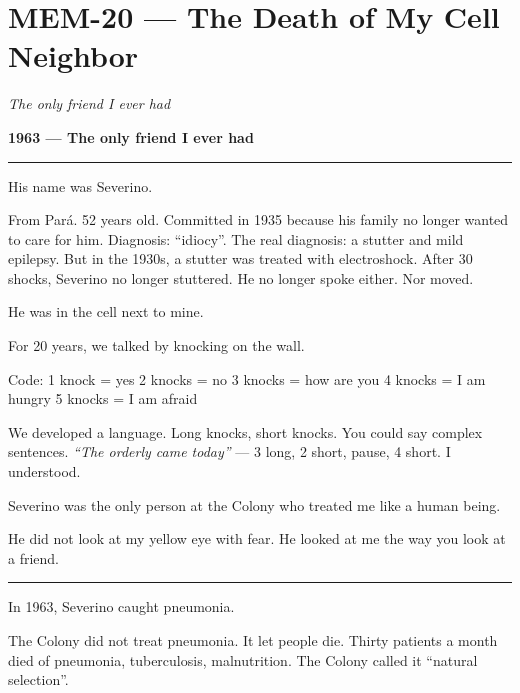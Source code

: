 \section*{\textbf{MEM-20} --- The Death of My Cell Neighbor}

\noindent \textit{The only friend I ever had}

\noindent \textbf{1963 --- The only friend I ever had}

\vspace{0.5em}\noindent\rule{\textwidth}{0.5pt}\vspace{0.5em}

\noindent His name was Severino.

\noindent From Pará. 52 years old. Committed in 1935 because his family no longer wanted to care for him. Diagnosis: \textquotedblleft{}idiocy\textquotedblright{}. The real diagnosis: a stutter and mild epilepsy. But in the 1930s, a stutter was treated with electroshock. After 30 shocks, Severino no longer stuttered. He no longer spoke either. Nor moved.

\noindent He was in the cell next to mine.

\noindent For 20 years, we talked by knocking on the wall.

\noindent Code:
1 knock = yes
2 knocks = no
3 knocks = how are you
4 knocks = I am hungry
5 knocks = I am afraid

\noindent We developed a language. Long knocks, short knocks. You could say complex sentences. \textit{\textquotedblleft{}The orderly came today\textquotedblright{}} --- 3 long, 2 short, pause, 4 short. I understood.

\noindent Severino was the only person at the Colony who treated me like a human being.

\noindent He did not look at my yellow eye with fear. He looked at me the way you look at a friend.

\vspace{0.5em}\noindent\rule{\textwidth}{0.5pt}\vspace{0.5em}

\noindent In 1963, Severino caught pneumonia.

\noindent The Colony did not treat pneumonia. It let people die. Thirty patients a month died of pneumonia, tuberculosis, malnutrition. The Colony called it \textquotedblleft{}natural selection\textquotedblright{}.

